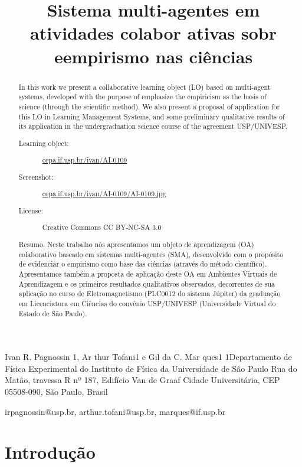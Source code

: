 \documentclass{article}
\title{Sistema multi-agentes em atividades colabor ativas sobr eempirismo nas ciências}
\begin{document}
Ivan R. Pagnossin 1, Ar thur Tofani1 e Gil da C. Mar ques1
1Departamento de Física Experimental do
Instituto de Física da Universidade de São Paulo
Rua do Matão, travessa R nº 187, Edifício Van de Graaf
Cidade Universitária, CEP 05508-090, São Paulo, Brasil

irpagnossin@usp.br, arthur.tofani@usp.br, marques@if.usp.br

\begin{abstract}
In this work we present a collaborative learning object (LO) based on multi-agent systems,
developed with the purpose of emphasize the empiricism as the basis of science (through the scientific method).
We also present a proposal of application for this LO in Learning Management Systems,
and some preliminary qualitative results of its application in the undergraduation science course of the agreement USP/UNIVESP.

\begin{description}
\item[Learning object:] \url{cepa.if.usp.br/ivan/AI-0109}
\item[Screenshot:] \url{cepa.if.usp.br/ivan/AI-0109/AI-0109.jpg}
\item[License:] Creative Commons CC BY-NC-SA 3.0
\end{description}
\end{abstract}

\begin{abstract}
Resumo. Neste trabalho nós apresentamos um objeto de aprendizagem (OA) colaborativo baseado em sistemas multi-agentes (SMA),
desenvolvido com o propósito de evidenciar o empirismo como base das ciências (através do método científico).
Apresentamos também a proposta de aplicação deste OA em Ambientes Virtuais de Aprendizagem e os primeiros resultados qualitativos
observados, decorrentes de sua aplicação no curso de Eletromagnetismo (PLC0012 do sistema Júpiter) da graduação em
Licenciatura em Ciências do convênio USP/UNIVESP (Universidade Virtual do Estado de São Paulo).
\end{abstract}

\section{Introdução}
\end{document}
